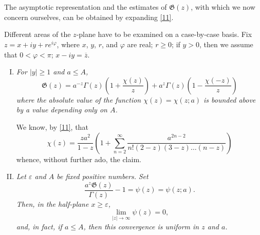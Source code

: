 \documentclass{article}
\theoremstyle{plain}
\newcommand{\GG}{\mathfrak{G}}
\renewcommand{\geq}{\geqslant}
\renewcommand{\leq}{\leqslant}
\newcommand{\oldpage}[1]{\marginpar{\footnotesize$\Big\vert$ \textit{p.~#1}}}
\begin{document}
\section{}
\label{section2}

The asymptotic representation and the estimates of $\GG(z)$, with which we now concern ourselves, can be obtained by expanding \cref{11}.

\oldpage{309}
Different areas of the $z$-plane have to be examined on a case-by-case basis.
Fix $z = x+iy + re^{i\varphi}$, where $x$, $y$, $r$, and $\varphi$ are real; $r\geq0$; if $y>0$, then we assume that $0<\varphi<\pi$; $x-iy = \overline{z}$.

\begin{enumerate}[I.]
  \item \emph{For $|y|\geq1$ and $a\leq A$,}
    \[
    \label{17}
      \GG(z)
      = a^{-z} \Gamma(z) \left(
        1 + \frac{\chi(z)}{z}
      \right) + a^z \Gamma(z) \left(
        1 - \frac{\chi(-z)}{z}
      \right)
    \tag{17}
    \]
    \emph{where the absolute value of the function $\chi(z)=\chi(z;a)$ is bounded above by a value depending only on $A$.}
    \label{I}

    We know, by \cref{11}, that
    \[
      \chi(z)
      = \frac{za^2}{1-z} \left(
        1 + \sum_{n=2}^\infty \frac{a^{2n-2}}{n!(2-z)(3-z)\ldots(n-z)}
      \right)
    \]
    whence, without further ado, the claim.
  \item \emph{Let $\varepsilon$ and $A$ be fixed positive numbers.}
    \emph{Set}
    \[
    \label{18}
      \frac{a^z\GG(z)}{\Gamma(z)} - 1
      = \psi(z) = \psi(z;a).
    \tag{18}
    \]
    \emph{Then, in the half-plane $x\geq\varepsilon$,}
    \[
    \label{19}
      \lim_{|z|\to\infty} \psi(z) = 0,
    \tag{19}
    \]
    \emph{and, in fact, if $a\leq A$, then this convergence is uniform in $z$ and $a$.}
    \label{II}


\end{enumerate}
\end{document}
